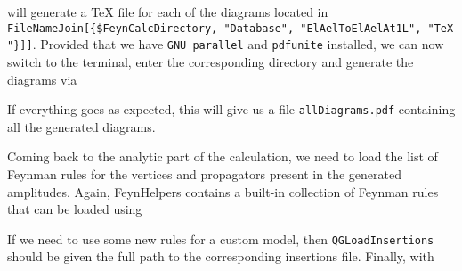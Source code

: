 \documentclass[../FeynHelpersManual.tex]{subfiles}
\begin{document}
\begin{Shaded}
\begin{Highlighting}[]
\OperatorTok{[}\OperatorTok{,}\OtherTok{{-}\textgreater{}}\OperatorTok{]}\NormalTok{;}
\end{Highlighting}
\end{Shaded}

will generate a TeX file for each of the diagrams located in
\texttt{FileNameJoin[\allowbreak{}\{\allowbreak{}\$FeynCalcDirectory,\ \allowbreak{}"Database",\ \allowbreak{}"ElAelToElAelAt1L",\ \allowbreak{}"TeX"\}]]}.
Provided that we have \texttt{GNU parallel} and \texttt{pdfunite}
installed, we can now switch to the terminal, enter the corresponding
directory and generate the diagrams via

\begin{Shaded}
\begin{Highlighting}[]
\SpecialCharTok{/}
\SpecialCharTok{/}
\end{Highlighting}
\end{Shaded}

If everything goes as expected, this will give us a file
\texttt{allDiagrams.pdf} containing all the generated diagrams.

Coming back to the analytic part of the calculation, we need to load the
list of Feynman rules for the vertices and propagators present in the
generated amplitudes. Again, FeynHelpers contains a built-in collection
of Feynman rules that can be loaded using

\begin{Shaded}
\begin{Highlighting}[]
\OperatorTok{[}\OperatorTok{]}\NormalTok{;}
\end{Highlighting}
\end{Shaded}

If we need to use some new rules for a custom model, then
\texttt{QGLoadInsertions} should be given the full path to the
corresponding insertions file. Finally, with

\begin{Shaded}
\begin{Highlighting}[]
\ExtensionTok{=}\OperatorTok{[}\OperatorTok{,}\OtherTok{{-}\textgreater{}}\OperatorTok{]}\NormalTok{;}
\end{Highlighting}
\end{Shaded}
\end{document}
